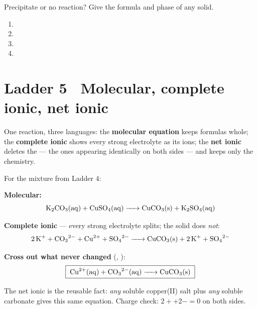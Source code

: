 \documentclass{apchem-worksheet}
\begin{document}
\begin{yourturn}
Precipitate or no reaction? Give the formula and phase of any solid.
\begin{enumerate}[leftmargin=*,itemsep=0.5em]
  \item {} \workspace[1.4cm]
  \item {} \workspace[1.4cm]
  \item {} \workspace[1.4cm]
  \item {} \workspace[1.4cm]
\end{enumerate}
\end{yourturn}

\section*{\sffamily Ladder 5 \textbullet\ Molecular, complete ionic, net
ionic}

One reaction, three languages: the \textbf{molecular equation} keeps
formulas whole; the \textbf{complete ionic} shows every strong
electrolyte as its ions; the \textbf{net ionic} deletes the
 --- the ones appearing identically on both sides
--- and keeps only the chemistry.

\begin{workedexample}
For the mixture from Ladder 4:

\textbf{Molecular:}
\[ \ce{K2CO3(aq) + CuSO4(aq) -> CuCO3(s) + K2SO4(aq)} \]

\textbf{Complete ionic} --- every  strong electrolyte splits;
the solid does \emph{not}:
\[ \ce{2K+ + CO3^2- + Cu^2+ + SO4^2- -> CuCO3(s) + 2K+ + SO4^2-} \]

\textbf{Cross out what never changed} (, ):
\[ \boxed{\;\ce{Cu^2+(aq) + CO3^2-(aq) -> CuCO3(s)}\;} \]

The net ionic is the reusable fact: \emph{any} soluble copper(II) salt
plus \emph{any} soluble carbonate gives this same equation. Charge check:
$2+ + 2- = 0$ on both sides.
\end{workedexample}
\end{document}
